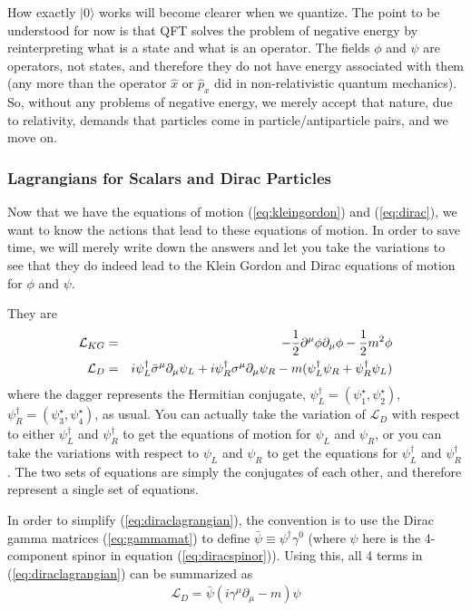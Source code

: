 \documentclass[12pt,epsf]{article}
\begin{document}
How exactly $|0\rangle$ works will become clearer when we quantize. 
The point to be understood for now is that QFT solves the problem of
negative energy by reinterpreting what is a state and what is an
operator.  The fields $\phi$ and $\psi$ are operators, not states, and
therefore they do not have energy associated with them (any more than
the operator $\hat x$ or $\hat p_x$ did in non-relativistic quantum
mechanics).  So, without any problems of negative energy, we merely
accept that nature, due to relativity, demands that particles come in
particle/antiparticle pairs, and we move on.  

\subsubsection{Lagrangians for Scalars and Dirac Particles}

Now that we have the equations of motion (\ref{eq:kleingordon}) and
(\ref{eq:dirac}), we want to know the actions that lead to these
equations of motion.  In order to save time, we will merely write down
the answers and let you take the variations to see that they do indeed
lead to the Klein Gordon and Dirac equations of motion for $\phi$ and
$\psi$.  

They are 
\begin{eqnarray}
\mathcal{L}_{KG} &=& -{1\over 2}\partial^{\mu}\phi \partial_{\mu}\phi -
{1\over 2}m^2 \phi \label{eq:kleingordonlagrangian} \\
\mathcal{L}_D &=& i\psi_L^{\dagger}\bar
\sigma^{\mu}\partial_{\mu}\psi_L+i\psi^{\dagger}_R\sigma^{\mu}
\partial_{\mu}\psi_R - m(\psi^{\dagger}_L\psi_R+\psi^{\dagger}_R\psi_L)
\label{eq:diraclagrangian}
\end{eqnarray}
where the dagger represents the Hermitian conjugate, $\psi^{\dagger}_L
= (\psi_1^{\star}, \psi_2^{\star})$, $\psi^{\dagger}_R =
(\psi_3^{\star}, \psi_4^{\star})$, as usual.  You can actually take the
variation of $\mathcal{L}_D$ with respect to either $\psi_L^{\dagger}$
and $\psi_R^{\dagger}$ to get the equations of motion for $\psi_L$ and
$\psi_R$, or you can take the variations with respect to $\psi_L$ and
$\psi_R$ to get the equations for $\psi_L^{\dagger}$ and
$\psi_R^{\dagger}$.  The two sets of equations are simply the
conjugates of each other, and therefore represent a single set of
equations.  

In order to simplify (\ref{eq:diraclagrangian}), the convention is to
use the Dirac gamma matrices (\ref{eq:gammamat}) to define $\bar \psi
\equiv \psi^{\dagger}\gamma^0$ (where  $\psi$ here is the 4-component
spinor in equation (\ref{eq:diracspinor})).  Using this, all 4 terms
in (\ref{eq:diraclagrangian}) can be summarized as 
\begin{eqnarray}
\mathcal{L}_D = \bar \psi (i \gamma^{\mu}\partial_{\mu} - m)\psi
\label{eq:truediraclagrangian}
\end{eqnarray}
\end{document}
